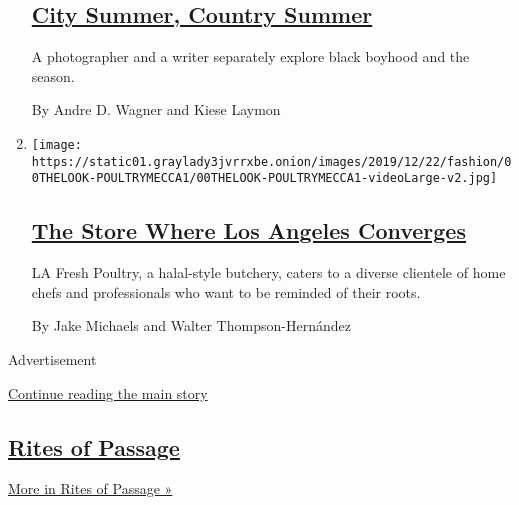 \begin{enumerate}
  \hypertarget{city-summer-country-summer}{%
  \subsection{\texorpdfstring{\href{/2020/06/06/style/city-summer-country-summer.html}{City
  Summer, Country
  Summer}}{City Summer, Country Summer}}\label{city-summer-country-summer}}

  A photographer and a writer separately explore black boyhood and the
  season.

  By Andre D. Wagner and Kiese Laymon
\item
  \texttt{[image: https://static01.graylady3jvrrxbe.onion/images/2019/12/22/fashion/00THELOOK-POULTRYMECCA1/00THELOOK-POULTRYMECCA1-videoLarge-v2.jpg]}

  \hypertarget{the-store-where-los-angeles-converges}{%
  \subsection{\texorpdfstring{\href{/2019/12/21/style/la-fresh-poultry-immigrant-family-recipes.html}{The
  Store Where Los Angeles
  Converges}}{The Store Where Los Angeles Converges}}\label{the-store-where-los-angeles-converges}}

  LA Fresh Poultry, a halal-style butchery, caters to a diverse
  clientele of home chefs and professionals who want to be reminded of
  their roots.

  By Jake Michaels and Walter Thompson-Hernández
\end{enumerate}

Advertisement

\protect\hyperlink{after-mid6}{Continue reading the main story}

\hypertarget{rites-of-passage}{%
\subsection{\texorpdfstring{\href{/column/rites-of-passage}{Rites of
Passage}}{Rites of Passage}}\label{rites-of-passage}}

\href{/column/rites-of-passage}{More in Rites of Passage »}

